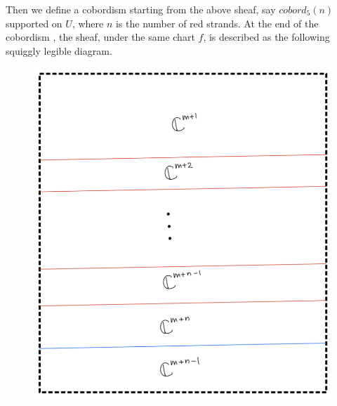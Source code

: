 Then we define a cobordism starting from the above sheaf, say $cobord_5(n)$ supported on $U$, where $n$ is the number of red strands. At the end of the cobordism , the sheaf, under the same chart $f$, is described as the following squiggly legible diagram.
\begin{figure}[H]
    \centering
    \includegraphics[scale = 0.95]{diagrams/cobord7/7.png}
    \caption{}
    \label{fig:your-label}
\end{figure}

